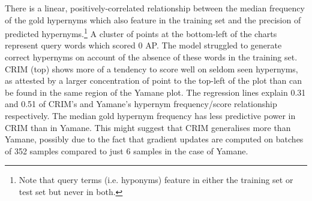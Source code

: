 There is a linear, positively-correlated relationship between the median frequency of the gold hypernyms which also feature in the training set and the precision of predicted hypernyms.\footnote{Note that query terms (i.e. hyponyms) feature in either the training set or test set but never in both.}  A cluster of points at the bottom-left of the charts represent query words which scored 0 \ac{AP}.  The model struggled to generate correct hypernyms on account of the absence of these words in the training set.  CRIM (top) shows more of a tendency to score well on seldom seen hypernyms, as attested by a larger concentration of point to the top-left of the plot than can be found in the same region of the Yamane plot.  The regression lines explain 0.31 and 0.51 of CRIM's and Yamane's hypernym frequency/score relationship respectively.  The median gold hypernym frequency has less predictive power in CRIM than in Yamane.  This might suggest that CRIM generalises more than Yamane, possibly due to the fact that gradient updates are computed on batches of 352 samples compared to just 6 samples in the case of Yamane.

